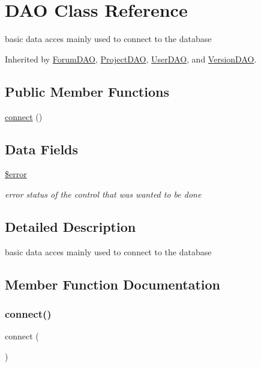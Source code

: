 \hypertarget{class_d_a_o}{}\section{D\+AO Class Reference}
\label{class_d_a_o}


basic data acces mainly used to connect to the database  




Inherited by \hyperlink{class_forum_d_a_o}{Forum\+D\+AO}, \hyperlink{class_project_d_a_o}{Project\+D\+AO}, \hyperlink{class_user_d_a_o}{User\+D\+AO}, and \hyperlink{class_version_d_a_o}{Version\+D\+AO}.

\subsection*{Public Member Functions}
\begin{DoxyCompactItemize}
\item 
\hyperlink{class_d_a_o_a78572828d11dcdf2a498497d9001d557}{connect} ()
\end{DoxyCompactItemize}
\subsection*{Data Fields}
\begin{DoxyCompactItemize}
\item 
\hyperlink{class_d_a_o_aeba2ab722cedda53dbb7ec1a59f45550}{\$error}
\begin{DoxyCompactList}\small\item\em error status of the control that was wanted to be done \end{DoxyCompactList}\end{DoxyCompactItemize}


\subsection{Detailed Description}
basic data acces mainly used to connect to the database 

\subsection{Member Function Documentation}
\mbox{\label{class_d_a_o_a78572828d11dcdf2a498497d9001d557}} 
\subsubsection{\texorpdfstring{connect()}{connect()}}
{\footnotesize\ttfamily connect (\begin{DoxyParamCaption}{ }\end{DoxyParamCaption})}

